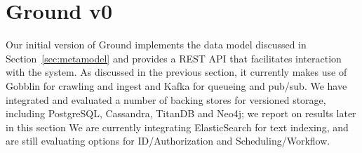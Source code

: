 \documentclass{sig-alternate}
\begin{document}

\smallitembot


\section{Ground \MakeLowercase{v}0}
\label{sec:prototype}

Our initial version of Ground implements the data model discussed in Section~\ref{sec:metamodel} and provides a REST API that facilitates interaction with the system. 
As discussed in the previous section, it currently makes use of Gobblin for crawling and ingest and Kafka for queueing and pub/sub. 
We have integrated and evaluated a number of backing stores for versioned storage, including PostgreSQL, Cassandra, TitanDB and Neo4j; we report on results later in this section
We are currently integrating ElasticSearch for text indexing, and are still evaluating options for ID/Authorization and Scheduling/Workflow. 
\end{document}
